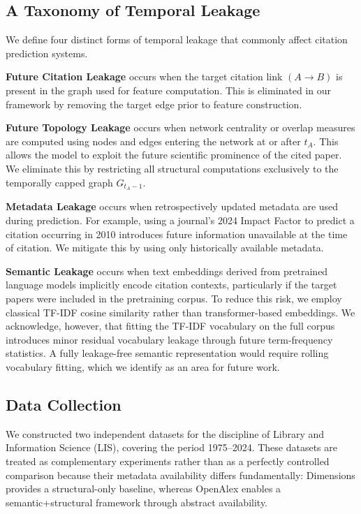 \documentclass[11pt,a4paper]{article}
\begin{document}
\subsection{A Taxonomy of Temporal Leakage}

We define four distinct forms of temporal leakage that commonly affect citation prediction systems.

\textbf{Future Citation Leakage} occurs when the target citation link \((A \to B)\) is present in the graph used for feature computation. This is eliminated in our framework by removing the target edge prior to feature construction.

\textbf{Future Topology Leakage} occurs when network centrality or overlap measures are computed using nodes and edges entering the network at or after \(t_A\). This allows the model to exploit the future scientific prominence of the cited paper. We eliminate this by restricting all structural computations exclusively to the temporally capped graph \(G_{t_A-1}\).

\textbf{Metadata Leakage} occurs when retrospectively updated metadata are used during prediction. For example, using a journal's 2024 Impact Factor to predict a citation occurring in 2010 introduces future information unavailable at the time of citation. We mitigate this by using only historically available metadata.

\textbf{Semantic Leakage} occurs when text embeddings derived from pretrained language models implicitly encode citation contexts, particularly if the target papers were included in the pretraining corpus. To reduce this risk, we employ classical TF-IDF cosine similarity rather than transformer-based embeddings. We acknowledge, however, that fitting the TF-IDF vocabulary on the full corpus introduces minor residual vocabulary leakage through future term-frequency statistics. A fully leakage-free semantic representation would require rolling vocabulary fitting, which we identify as an area for future work.

\subsection{Data Collection}

We constructed two independent datasets for the discipline of Library and Information Science (LIS), covering the period 1975--2024. These datasets are treated as complementary experiments rather than as a perfectly controlled comparison because their metadata availability differs fundamentally: Dimensions provides a structural-only baseline, whereas OpenAlex enables a semantic+structural framework through abstract availability.
\end{document}
